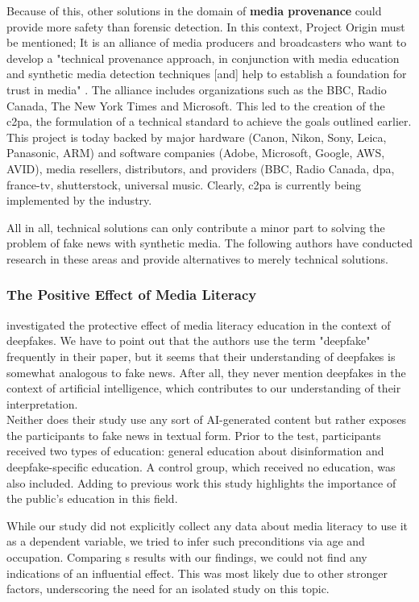 \documentclass[
  a4paper,  %
  twoside,  %
  bibliography=totoc,
  headsepline,
  cleardoublepage=empty,
  parskip=half,
  draft=false
]{scrbook}
\begin{document}
Because of this, other solutions in the domain of \textbf{media provenance} could provide more safety than forensic detection. In this context, Project Origin must be mentioned; It is an alliance of media producers and broadcasters who want to develop a "technical provenance approach, in conjunction with media education and synthetic media detection techniques [and] help to establish a foundation for trust in media" \cite{ProjectOrigin}. The alliance includes organizations such as the BBC, Radio Canada, The New York Times and Microsoft. This led to the creation of the \gls{c2pa}, the formulation of a technical standard to achieve the goals outlined earlier. This project is today backed by major hardware (Canon, Nikon, Sony, Leica, Panasonic, ARM) and software companies (Adobe, Microsoft, Google, AWS, AVID), media resellers, distributors, and providers (BBC, Radio Canada, dpa, france-tv, shutterstock, universal music. Clearly, \gls{c2pa} is currently being implemented by the industry.

All in all, technical solutions can only contribute a minor part to solving the problem of fake news with synthetic media. The following authors have conducted research in these areas and provide alternatives to merely technical solutions. 

\subsubsection*{The Positive Effect of Media Literacy}
\citeauthor{hwangEffectsDisinformationUsing2021} investigated the protective effect of media literacy education in the context of deepfakes. We have to point out that the authors use the term "deepfake" frequently in their paper, but it seems that their understanding of deepfakes is somewhat analogous to fake news. After all, they never mention deepfakes in the context of artificial intelligence, which contributes to our understanding of their interpretation. \\
Neither does their study use any sort of AI-generated content but rather exposes the participants to fake news in textual form. Prior to the test, participants received two types of education: general education about disinformation and deepfake-specific education. A control group, which received no education, was also included. Adding to previous work this study highlights the importance of the public's education in this field.

While our study did not explicitly collect any data about media literacy to use it as a dependent variable, we tried to infer such preconditions via age and occupation. Comparing \citeauthor{hwangEffectsDisinformationUsing2021}s results with our findings, we could not find any indications of an influential effect. This was most likely due to other stronger factors, underscoring the need for an isolated study on this topic.
\end{document}
